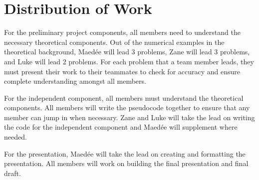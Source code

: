 \documentclass[10pt]{article}
\begin{document}
\section{Distribution of Work}
For the preliminary project components, all members need to understand the necessary theoretical components. Out of the numerical examples in the theoretical background, Maed\'ee will lead 3 problems, Zane will lead 3 problems, and Luke will lead 2 problems. For each problem that a team member leads, they must present their work to their teammates to check for accuracy and ensure complete understanding amongst all members. 

For the independent component, all members must understand the theoretical components. All members will write the pseudocode together to ensure that any member can jump in when necessary. Zane and Luke will take the lead on writing the code for the independent component and Maed\'ee will supplement where needed. 

For the presentation,  Maed\'ee will take the lead on creating and formatting the presentation. All members will work on building the final presentation and final draft.

\printbibliography
\end{document}
